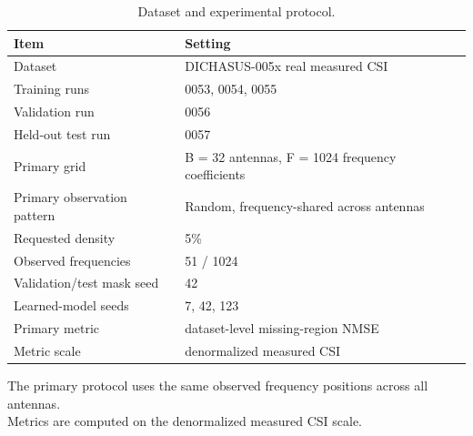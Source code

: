 \begin{table}[t]
\centering
\caption{Dataset and experimental protocol.}
\label{tab:protocol}
\begin{tabular}{ll}
\hline
Item & Setting \\
\hline
Dataset & DICHASUS-005x real measured CSI \\
Training runs & 0053, 0054, 0055 \\
Validation run & 0056 \\
Held-out test run & 0057 \\
Primary grid & B = 32 antennas, F = 1024 frequency coefficients \\
Primary observation pattern & Random, frequency-shared across antennas \\
Requested density & 5\% \\
Observed frequencies & 51 / 1024 \\
Validation/test mask seed & 42 \\
Learned-model seeds & 7, 42, 123 \\
Primary metric & dataset-level missing-region NMSE \\
Metric scale & denormalized measured CSI \\
\hline
\end{tabular}
\vspace{1mm}
\begin{minipage}{0.98\textwidth}
\footnotesize
The primary protocol uses the same observed frequency positions across all antennas.\\
Metrics are computed on the denormalized measured CSI scale.\\
\end{minipage}
\end{table}
